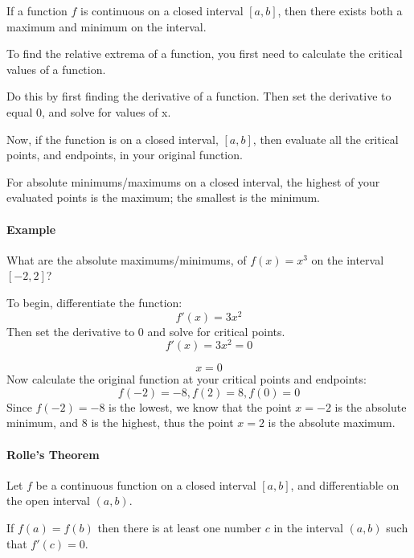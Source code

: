 If a function $f$ is continuous on a closed interval $[a,b]$, then there exists both a maximum and minimum on the interval.



To find the relative extrema of a function, you first need to calculate the critical values of a function.



Do this by first finding the derivative of a function. Then set the derivative to equal 0, and solve for values of x.



Now, if the function is on a closed interval, $[a,b]$, then evaluate all the critical points, and endpoints, in your original function.



For absolute minimums/maximums on a closed interval, the highest of your evaluated points is the maximum; the smallest is the minimum.



\paragraph{Example}



What are the absolute maximums/minimums, of $f(x) = x^3$ on the interval $[-2,2]$?



To begin, differentiate the function:
$$
f'(x) = 3x^2
$$
Then set the derivative to 0 and solve for critical points.
$$
f'(x) = 3x^2 = 0
$$



$$
x = 0
$$
Now calculate the original function at your critical points and endpoints:
$$
f(-2) = -8, f(2) = 8, f(0) = 0
$$
Since $f(-2) = -8$ is the lowest, we know that the point $x = -2$ is the absolute minimum, and 8 is the highest, thus the point $x = 2$ is the absolute maximum.



\paragraph{Rolle's Theorem}



Let $f$ be a continuous function on a closed interval $[a,b]$, and differentiable on the open interval $(a,b)$.



If $f(a) = f(b)$ then there is at least one number $c$ in the interval $(a,b)$ such that $f'(c) = 0$.



